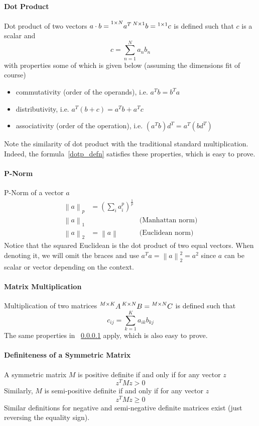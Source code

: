 \documentclass{article}
\newcommand{\norm}[2][]{\left\lVert#2\right\rVert_{#1}}
\numberwithin{equation}{subsection}
\begin{document}
\paragraph{Dot Product}
\label{dotp}
Dot product of two vectors $a\cdot b=\prescript{1\times N}{}{a^T}\prescript{N\times 1}{}{b}=\prescript{1 \times 1}{}{c}$ is defined such that $c$ is a scalar and
\begin{equation}
    c = \sum_{n=1}^N a_nb_n \label{dotp_defn}
\end{equation}
with properties some of which is given below (assuming the dimensions fit of course)
\begin{itemize}
    \item commutativity (order of the operands), i.e. $a^Tb = b^Ta$
    \item distributivity, i.e. $a^T(b+c) = a^Tb+a^Tc$
    \item associativity (order of the operation), i.e. $(a^Tb)d^T = a^T(bd^T)$
\end{itemize}
Note the similarity of dot product with the traditional standard multiplication. Indeed, the formula~\ref{dotp_defn} satisfies these properties, which is easy to prove.
\paragraph{P-Norm}
P-Norm of a vector $a$
\begin{align}
    \norm[p]{a} &= (\sum_i a_i^p)^{\frac{1}{p}} &\\
    \norm[1]{a} & & \text{(Manhattan norm)} \label{man_norm}\\
    \norm[2]{a} &= \norm[]{a} & \text{(Euclidean norm)} \label{euc_norm}
\end{align}
Notice that the squared Euclidean is the dot product of two equal vectors. When denoting it, we will omit the braces and use $a^Ta = \norm[2]{a}^2 = a^2$ since $a$ can be scalar or vector depending on the context.
\paragraph{Matrix Multiplication}
Multiplication of two matrices 
$\prescript{M\times K}{}{A}\prescript{K\times N}{}{B}=\prescript{M\times N}{}{C}$ is defined such that 
\begin{equation}
    c_{ij} = \sum_{k=1}^K a_{ik}b_{kj} 
    \label{matmult}
\end{equation}
The same properties in ~\ref{dotp} apply, which is also easy to prove.
\paragraph{Definiteness of a Symmetric Matrix} 
A symmetric matrix $M$ is positive definite if and only if for any vector $z$
\begin{equation}
    z^TMz > 0
\end{equation}
Similarly, $M$ is semi-positive definite if and only if for any vector $z$
\begin{equation}
    z^TMz \geq 0
\end{equation}
Similar definitions for negative and semi-negative definite matrices exist (just reversing the equality sign).
\end{document}

